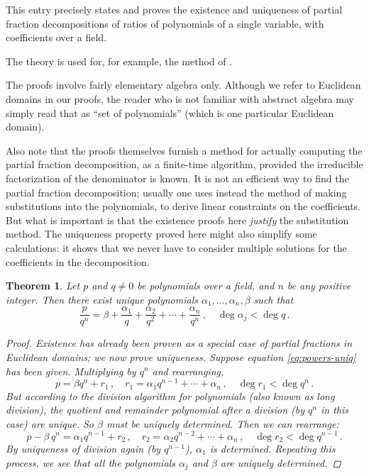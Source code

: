 \documentclass[12pt]{article}
\newtheorem{thm}{Theorem}
\begin{document}
This entry precisely states and proves 
the existence and uniqueness of partial fraction decompositions
of ratios of polynomials of a single variable, with coefficients over a field.  

The theory is used for, for example,
the method of .

The proofs involve fairly elementary algebra only. Although we refer
to Euclidean domains in our proofs, the reader who is not familiar with abstract 
algebra may simply read that as ``set of polynomials''
(which is one particular Euclidean domain).

Also note that the proofs themselves furnish a method for actually computing
the partial fraction decomposition, as a finite-time algorithm,
provided the irreducible factorization of the denominator is known.
It is not an efficient way to find the partial fraction decomposition; usually 
one uses instead the method of making substitutions into the polynomials, 
to derive linear constraints on the coefficients.
But what is important is that the existence proofs here 
\emph{justify} the substitution method.  The uniqueness property proved here
might also simplify some calculations: it shows that we never have
to consider multiple solutions for the coefficients in the decomposition.


\begin{thm}
\label{thm:powers-uniq}
Let $p$ and $q \neq 0$ be polynomials over a field,
and $n$ be any positive integer.
Then there exist unique polynomials 
$\alpha_1, \dotsc, \alpha_n, \beta$ such that
\begin{equation}
\label{eq:powers-uniq}
\frac{p}{q^n} = \beta + \frac{\alpha_1}{q} + \frac{\alpha_2}{q^2} + \dotsb + \frac{\alpha_n}{q^n}\,, \quad
\deg \alpha_j < \deg q\,.
\end{equation}

\begin{proof}
Existence has already been proven as a special case of partial fractions in Euclidean domains; 
we now prove uniqueness.  
Suppose equation \eqref{eq:powers-uniq} has been given.
Multiplying by $q^n$ and rearranging, 
\[
p = \beta q^n + r_1 \,, \quad r_1 = \alpha_1 q^{n-1} + \dotsb + \alpha_n\,, \quad \deg r_1 < \deg q^n\,.
\]
But according to the division algorithm for polynomials (also known as long division), the quotient and remainder polynomial
after a division (by $q^n$ in this case) are unique.  
So $\beta$ must be uniquely determined.
Then we can rearrange:
\[
p - \beta \, q^n = \alpha_1 q^{n-1} + r_2\,, \quad r_2 = 
\alpha_2 q^{n-2} + \dotsb + \alpha_n\,, \quad \deg r_2 < \deg q^{n-1}\,.
\]
By uniqueness of division again (by $q^{n-1}$), $\alpha_1$ is determined.
Repeating this process, we see that all the polynomials $\alpha_j$ and $\beta$
are uniquely determined.
\end{proof}
\end{thm}
\end{document}
